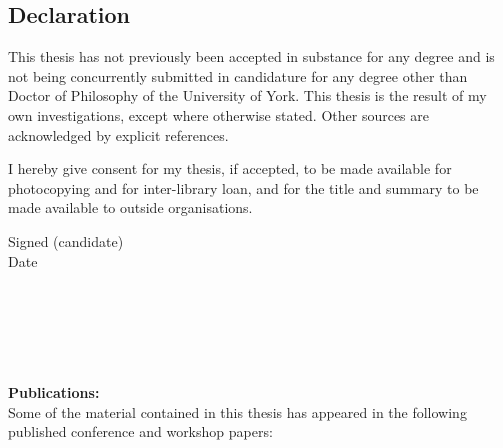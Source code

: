 


\begin{declaration}      %

 \chapter*{Declaration}
    
  \newlength{\candwidth}
  \settowidth{\candwidth}{(candidate)}
  \noindent This thesis has not previously been accepted in substance
  for any degree and is not being concurrently submitted in candidature
  for any degree other than Doctor of Philosophy of the University of York.
  This thesis is the result of my own investigations, except
  where otherwise stated. Other sources are acknowledged by explicit references.

  I hereby give consent for my thesis, if accepted, to be made
  available for photocopying and for inter-library loan, and for the
  title and summary to be made available to outside organisations.
  \vspace{0.5in}

  \begin{minipage}{5.0in}
    \noindent Signed \dotfill (candidate)\\[1.5em]
    \noindent Date \dotfill \hspace{\candwidth}
  \end{minipage}
  \vspace{0.5in}  
  \\
  \\
  \\
  \\
  \\
  \textbf{Publications:}\\
  \noindent Some of the material contained in this thesis has appeared
  in the following published conference and workshop papers:

\end{declaration}



